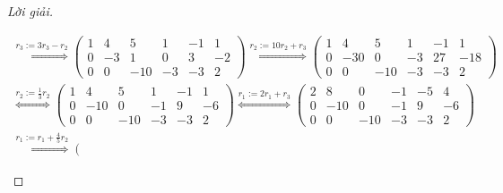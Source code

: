 \documentclass[class=linearalgebra,crop=false]{standalone}
\begin{document}
\begin{proof}[Lời giải]
\begin{enumerate}[label = (\alph*)]
\begin{gather*}
                  \stackrel{
                      r_{3} := 3r_{3} - r_{2}
                  }{\Longleftrightarrow}
                  \left(
                  \begin{array}{ccc|ccc}
                          1 & 4  & 5   & 1  & -1 & 1  \\
                          0 & -3 & 1   & 0  & 3  & -2 \\
                          0 & 0  & -10 & -3 & -3 & 2
                      \end{array}
                  \right)
                  \stackrel{
                      r_{2} := 10r_{2} + r_{3}
                  }{\Longleftrightarrow}
                  \left(
                  \begin{array}{ccc|ccc}
                          1 & 4   & 5   & 1  & -1 & 1   \\
                          0 & -30 & 0   & -3 & 27 & -18 \\
                          0 & 0   & -10 & -3 & -3 & 2
                      \end{array}
                  \right) \\
                  \stackrel{
                  r_{2} := \frac{1}{3}r_{2}
                  }{\Longleftrightarrow}
                  \left(
                  \begin{array}{ccc|ccc}
                          1 & 4   & 5   & 1  & -1 & 1  \\
                          0 & -10 & 0   & -1 & 9  & -6 \\
                          0 & 0   & -10 & -3 & -3 & 2
                      \end{array}
                  \right)
                  \stackrel{
                      r_{1} := 2r_{1} + r_{3}
                  }{\Longleftrightarrow}
                  \left(
                  \begin{array}{ccc|ccc}
                          2 & 8   & 0   & -1 & -5 & 4  \\
                          0 & -10 & 0   & -1 & 9  & -6 \\
                          0 & 0   & -10 & -3 & -3 & 2
                      \end{array}
                  \right) \\
                  \stackrel{
                  r_{1} := r_{1} + \frac{4}{5}r_{2}
                  }{\Longleftrightarrow}
                  \left(
                  \begin{array}{ccc|ccc}

\end{array}
\end{gather*}
\end{enumerate}
\end{proof}
\end{document}
